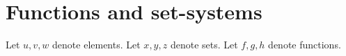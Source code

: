 \documentclass[../../set-theory.ftl.tex]{subfiles}
\begin{document}
  \section{Functions and set-systems}

  \begin{forthel}
  \end{forthel}

  \begin{forthel}
  \end{forthel}

  \begin{forthel}
    Let $u,v,w$ denote elements.
    Let $x,y,z$ denote sets.
    Let $f,g,h$ denote functions.
  \end{forthel}
\end{document}
